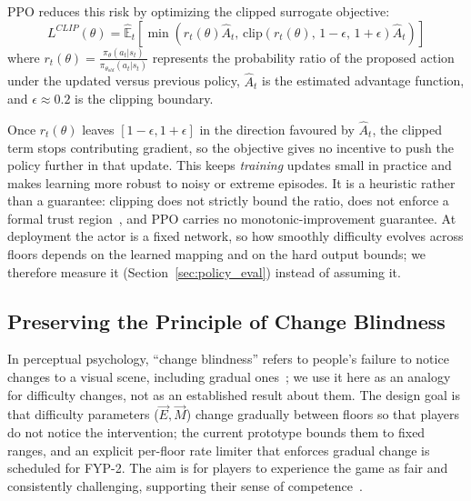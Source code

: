 PPO reduces this risk by optimizing the clipped surrogate objective:
\begin{equation}
L^{CLIP}(\theta) = \hat{\mathbb{E}}_t \left[ \min\left(r_t(\theta)\hat{A}_t, \, \text{clip}\left(r_t(\theta), \, 1-\epsilon, \, 1+\epsilon\right)\hat{A}_t\right) \right]
\label{eq:ppo_clip}
\end{equation}
where $r_t(\theta) = \frac{\pi_\theta(a_t | s_t)}{\pi_{\theta_{old}}(a_t | s_t)}$ represents the probability ratio of the proposed action under the updated versus previous policy, $\hat{A}_t$ is the estimated advantage function, and $\epsilon \approx 0.2$ is the clipping boundary.

Once $r_t(\theta)$ leaves $[1-\epsilon, 1+\epsilon]$ in the direction favoured by $\hat{A}_t$, the clipped term stops contributing gradient, so the objective gives no incentive to push the policy further in that update. This keeps \emph{training} updates small in practice and makes learning more robust to noisy or extreme episodes. It is a heuristic rather than a guarantee: clipping does not strictly bound the ratio, does not enforce a formal trust region~\cite{wang2019truly}, and PPO carries no monotonic-improvement guarantee. At deployment the actor is a fixed network, so how smoothly difficulty evolves across floors depends on the learned mapping and on the hard output bounds; we therefore measure it (Section~\ref{sec:policy_eval}) instead of assuming it.

\subsection{Preserving the Principle of Change Blindness}
In perceptual psychology, ``change blindness'' refers to people's failure to notice changes to a visual scene, including gradual ones~\cite{simons2005change}; we use it here as an analogy for difficulty changes, not as an established result about them. The design goal is that difficulty parameters ($\vec{E}, \vec{M}$) change gradually between floors so that players do not notice the intervention; the current prototype bounds them to fixed ranges, and an explicit per-floor rate limiter that enforces gradual change is scheduled for FYP-2. The aim is for players to experience the game as fair and consistently challenging, supporting their sense of competence~\cite{tyack2020sdt}.
